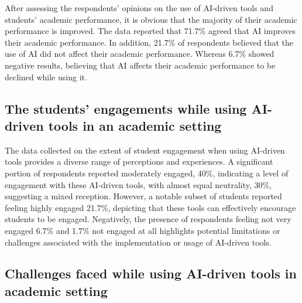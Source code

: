 After assessing the respondents' opinions on the use of AI-driven tools and students'
academic performance, it is obvious that the majority of their academic performance is improved.
The data reported that 71.7\% agreed that AI improves their academic performance.
In addition, 21.7\% of respondents believed that the use of AI did not affect their
academic performance. Whereas 6.7\% showed negative results, believing
that AI affects their academic performance to be declined while using it.
\subsection{The students' engagements while using AI-driven tools in an academic setting}


\begin{figure}[H]
	\centering
\end{figure}

The data collected on the extent of student engagement when using AI-driven
tools provides a diverse range of perceptions and experiences.
A significant portion of respondents reported moderately engaged, 40\%,
indicating a level of engagement with these AI-driven tools, with almost equal neutrality,
30\%, suggesting a mixed reception. However, a notable subset of students
reported feeling highly engaged 21.7\%, depicting that these tools can effectively
encourage students to be engaged.
Negatively, the presence of respondents feeling not very engaged 6.7\% and 1.7\% not
engaged at all highlights potential limitations or challenges associated with the
implementation or usage of AI-driven tools.

\subsection{Challenges faced while using AI-driven tools in academic setting}

